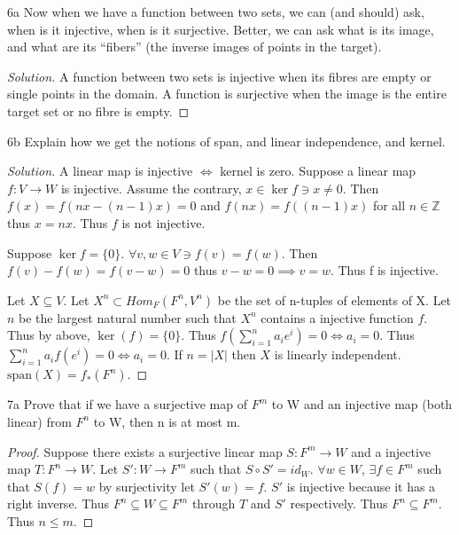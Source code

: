 \documentclass{article}
\newcommand{\Z}{\mathbb{Z}}
\newenvironment{solution}
{\renewcommand\qedsymbol{$\blacksquare$}\begin{proof}[Solution]}
{\end{proof}}
\begin{document}
\bigskip

\begin{PROB}{6a}\label{Problem 6a.}
    Now when we have a function between two sets, we can (and should) ask, when is it injective, when is it surjective. Better, we can ask what is its image, and what are its “fibers” (the inverse images of points in the target).
\end{PROB}
\begin{solution}
    A function between two sets is injective when its fibres are empty or single points in the domain. A function is surjective when the image is the entire target set or no fibre is empty. 
\end{solution}

\begin{PROB}{6b}\label{Problem 6b.}
    Explain how we get the notions of span, and linear independence, and kernel.
\end{PROB}
\begin{solution}
    A linear map is injective $\iff$ kernel is zero. Suppose a linear map $f: V \to W$ is injective. Assume the contrary, $x \in \ker f \ni x \neq 0$. Then $f(x) = f(nx - (n-1)x) = 0$ and $f(nx) = f((n-1)x)$ for all $n \in \Z$ thus $x = nx$. Thus $f$ is not injective. 
    
    Suppose $\ker f = \{0\}$. $\forall v, w \in V \ni f(v) = f(w)$. Then $f(v) - f(w) = f(v - w) = 0$ thus $v - w = 0 \implies v = w$. Thus f is injective.

    Let $X \subseteq V$. Let $X^n \subset Hom_F(F^n, V^n)$ be the set of n-tuples of elements of X. Let $n$ be the largest natural number such that $X^n$ contains a injective function $f$. Thus by above, $\ker(f) = \{0\}$. Thus $f(\sum_{i=1}^{n}a_ie^i) = 0 \iff a_i = 0$. Thus $\sum_{i=1}^{n} a_i f(e^i) = 0 \iff a_i = 0$. If $n = |X|$ then $X$ is linearly independent. $\text{span}(X) = f_*(F^n)$.
\end{solution}

\bigskip

\begin{claim}{7a}
    Prove that if we have a surjective map of $F^m$ to W and an injective map (both linear) from $F^n$ to W, then n is at most m.
\end{claim}
\begin{proof}
    Suppose there exists a surjective linear map $S: F^m \to W$ and a injective map $T: F^n \to W$. Let $S': W \to F^m$ such that $S \circ S' = id_W$. $\forall w \in W$, $\exists f \in F^m$ such that $S(f) = w$ by surjectivity let $S'(w) = f$. $S'$ is injective because it has a right inverse. Thus $F^n \subseteq W \subseteq F^m$ through $T$ and $S'$ respectively. Thus $F^n \subseteq F^m$. Thus $n \leq m$.
\end{proof}
\end{document}
